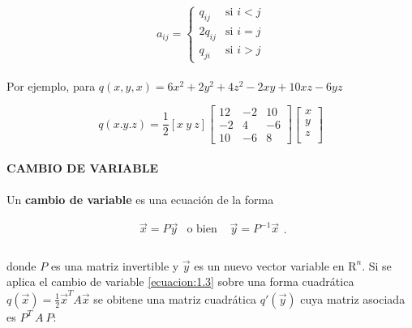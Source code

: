 \begin{equation}
a_{ij} = \left \{ 
    \begin{matrix} 
    q_{ij} & \mbox{si } i < j\\
    2q_{ij} & \mbox{si } i = j\\ 
    q_{ji} & \mbox{si } i > j
    \end{matrix}\right.
    \label{ecuacion:1.2}
\end{equation}

\paragraph*{}
Por ejemplo, para $q(x, y, x) = 6x^{2} + 2y^{2} + 4z^{2} - 2xy + 10xz - 6yz$

\begin{equation*}
q(x. y. z) = \frac{1}{2}\left[x ~  y ~ z\right] 
\begin{bmatrix}
12 & -2 & 10\\
-2 & 4 & -6\\
10 & -6 & 8
\end{bmatrix}
\begin{bmatrix}
x\\
y\\
z\\
\end{bmatrix}
\end{equation*}

\paragraph*{}
\textbf{CAMBIO DE VARIABLE}

\paragraph*{}
Un \textbf{cambio de variable} es una ecuación de la forma

\begin{equation}
    \begin{matrix} 
    \overrightarrow{x} = P\overrightarrow{y} & \mbox{o bien } & \overrightarrow{y} = P^{-1}\overrightarrow{x}\\
    \end{matrix}.
    \label{ecuacion:1.3}
\end{equation}

\paragraph*{}
donde $P$ es una matriz invertible y $\overrightarrow{y}$ es un nuevo vector variable en $\mathrm{R}^{n}$. Si se aplica el cambio de variable \ref{ecuacion:1.3} sobre una forma cuadrática $q(\overrightarrow{x}) = \frac{1}{2}\overrightarrow{x}^{T}A\overrightarrow{x}$ se obitene una matriz cuadrática $q'(\overrightarrow{y})$ cuya matriz asociada es $P^{T} ~ A ~ P$:

